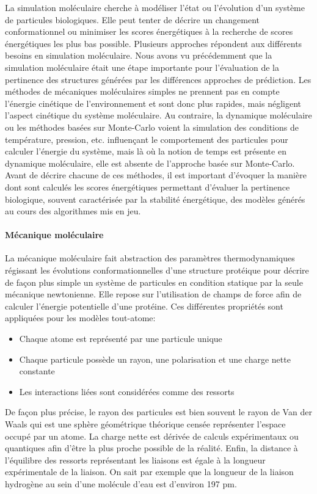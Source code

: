 La simulation moléculaire cherche à modéliser l'état ou l'évolution d'un système de particules biologiques. Elle peut tenter de décrire un changement conformationnel ou minimiser les scores énergétiques à la recherche de scores énergétiques les plus bas possible. Plusieurs approches répondent aux différents besoins en simulation moléculaire. Nous avons vu précédemment que la simulation moléculaire était une étape importante pour l'évaluation de la pertinence des structures générées par les différences approches de prédiction. 
Les méthodes de mécaniques moléculaires simples ne prennent pas en compte l'énergie cinétique de l'environnement et sont donc plus rapides, mais négligent l'aspect cinétique du système moléculaire. Au contraire, la dynamique moléculaire ou les méthodes basées sur Monte-Carlo voient la simulation des conditions de température, pression, etc. influençant le comportement des particules pour calculer l'énergie du système, mais là où la notion de temps est présente en dynamique moléculaire, elle est absente de l'approche basée sur Monte-Carlo.
Avant de décrire chacune de ces méthodes, il est important d'évoquer la manière dont sont calculés les scores énergétiques permettant d'évaluer la pertinence biologique, souvent caractérisée par la stabilité énergétique, des modèles générés au cours des algorithmes mis en jeu.

\paragraph{Mécanique moléculaire}

La mécanique moléculaire fait abstraction des paramètres thermodynamiques régissant les évolutions conformationnelles d'une structure protéique pour décrire de façon plus simple un système de particules en condition statique par la seule mécanique newtonienne. Elle repose sur l'utilisation de champs de force afin de calculer l'énergie potentielle d'une protéine. Ces différentes propriétés sont appliquées pour les modèles tout-atome:

\begin{itemize}
	\item Chaque atome est représenté par une particule unique
	\item Chaque particule possède un rayon, une polarisation et une charge nette constante
	\item Les interactions liées sont considérées comme des ressorts 
\end{itemize}

De façon plus précise, le rayon des particules est bien souvent le rayon de Van der Waals qui est une sphère géométrique théorique censée représenter l'espace occupé par un atome. La charge nette est dérivée de calculs expérimentaux ou quantiques afin d'être la plus proche possible de la réalité. Enfin, la distance à l'équilibre des ressorts représentant les liaisons est égale à la longueur expérimentale de la liaison. On sait par exemple que la longueur de la liaison hydrogène au sein d'une molécule d'eau est d'environ 197 pm.


